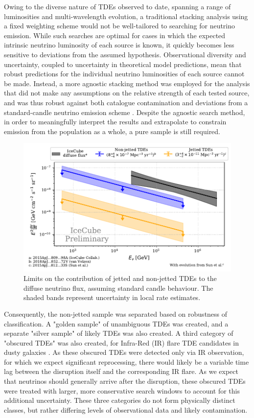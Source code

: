 \documentclass{PoS}
\begin{document}
Owing to the diverse nature of TDEs observed to date, spanning a range of luminosities and multi-wavelength evolution, a traditional stacking analysis using a fixed weighting scheme would not be well-tailored to searching for neutrino emission. While such searches are optimal for cases in which the expected intrinsic neutrino luminosity of each source is known, it quickly becomes less sensitive to deviations from the assumed hypothesis. Observational diversity and uncertainty, coupled to uncertainty in theoretical model predictions, mean that robust predictions for the individual neutrino luminosities of each source cannot be made. Instead, a more agnostic stacking method was employed for the analysis that did not make any assumptions on the relative strength of each tested source, and was thus robust against both catalogue contamination and deviations from a standard-candle neutrino emission scheme \cite{Stasik2018Search}. Despite the agnostic search method, in order to meaningfully interpret the results and extrapolate to constrain emission from the population as a whole, a pure sample is still required. 

\begin{figure}[!ht]
	\centering \includegraphics[width=\textwidth]{figures/diffuse_flux_global_fit}
	\caption{Limits on the contribution of jetted and non-jetted TDEs to the diffuse neutrino flux, assuming standard candle behaviour. The shaded bands represent uncertainty in local rate estimates.}
	\label{fig:DiffuseFlux}
\end{figure}

Consequently, the non-jetted sample was separated based on robustness of classification. A "golden sample" of unambiguous TDEs was created, and a separate "silver sample" of likely TDEs was also created. A third category of "obscured TDEs" was also created, for Infra-Red (IR) flare TDE candidates in dusty galaxies \cite{Wang:2018mxl}. As these obscured TDEs were detected only via IR observation, for which we expect significant reprocessing, there would likely be a variable time lag between the disruption itself and the corresponding IR flare. As we expect that neutrinos should generally arrive after the disruption, these obscured TDEs were treated with larger, more conservative search windows to account for this additional uncertainty. These three categories do not form physically distinct classes, but rather differing levels of observational data and likely contamination.
\end{document}
